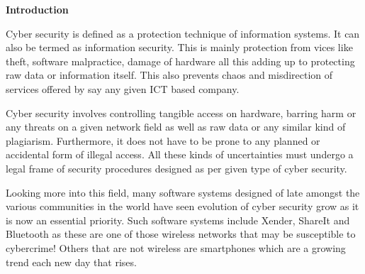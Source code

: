 \documentclass[10pt,a4paper]{report}
\author{
	
	KIZITO SEBUTEMBA EZEKIEL	213012200   	13/U/6970/EVE\\
	
	AINEBYONA DONALD	216013098	 16/U/2970/PS\\
	
	KYOBWEINE BIKANGAGA PRISCA  	216002579   	16/U/6489/PS\\
	
	KAHIGIRIZA PETER WARREN	  216002577	  16/U/5173/PS
	
}
\begin{document}
\begin{flushleft}
	\textbf{Introduction}\linebreak
	
	Cyber security is defined as a protection technique of information systems. It can also be termed as information security. This is mainly protection from vices like theft, software malpractice, damage of hardware all this adding up to protecting raw data or information itself. This also prevents chaos and misdirection of services offered by say any given ICT based company.\linebreak
	\linebreak
	
	Cyber security involves controlling tangible access on hardware, barring harm or any threats on a given network field as well as raw data or any similar kind of plagiarism. Furthermore, it does not have to be prone to any planned or accidental form of illegal access. All these kinds of uncertainties must undergo a legal frame of security procedures designed as per given type of cyber security.\linebreak\linebreak
	
	Looking more into this field, many software systems designed of late amongst the various communities in the world have seen evolution of cyber security grow as it is now an essential priority. Such software systems include Xender, ShareIt and Bluetooth as these are one of those wireless networks that may be susceptible to cybercrime! Others that are not wireless are smartphones which are a growing trend each new day that rises.\linebreak\linebreak
	

\end{flushleft}
\end{document}
